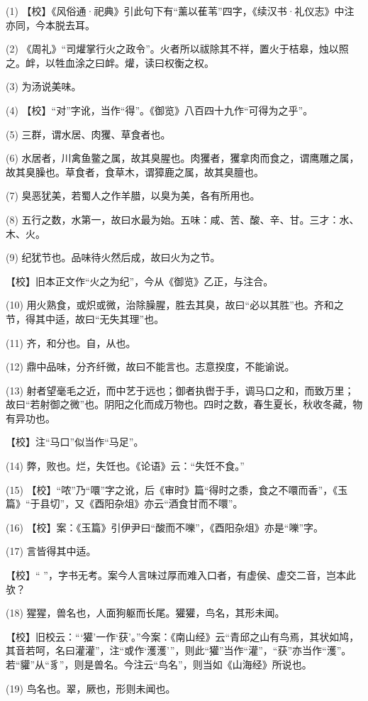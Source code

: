 \documentclass[12pt,UTF8]{ctexbook}
\begin{document}
(1) 【校】《风俗通·祀典》引此句下有“薰以萑苇”四字，《续汉书·礼仪志》中注亦同，今本脱去耳。

(2) 《周礼》“司爟掌行火之政令”。火者所以祓除其不祥，置火于桔皋，烛以照之。衅，以牲血涂之曰衅。爟，读曰权衡之权。

(3) 为汤说美味。

(4) 【校】“对”字讹，当作“得”。《御览》八百四十九作“可得为之乎”。

(5) 三群，谓水居、肉玃、草食者也。

(6) 水居者，川禽鱼鳖之属，故其臭腥也。肉玃者，玃拿肉而食之，谓鹰雕之属，故其臭臊也。草食者，食草木，谓獐鹿之属，故其臭膻也。

(7) 臭恶犹美，若蜀人之作羊腊，以臭为美，各有所用也。

(8) 五行之数，水第一，故曰水最为始。五味：咸、苦、酸、辛、甘。三才：水、木、火。

(9) 纪犹节也。品味待火然后成，故曰火为之节。

【校】旧本正文作“火之为纪”，今从《御览》乙正，与注合。

(10) 用火熟食，或炽或微，治除臊腥，胜去其臭，故曰“必以其胜”也。齐和之节，得其中适，故曰“无失其理”也。

(11) 齐，和分也。自，从也。

(12) 鼎中品味，分齐纤微，故曰不能言也。志意揆度，不能谕说。

(13) 射者望毫毛之近，而中艺于远也；御者执辔于手，调马口之和，而致万里；故曰“若射御之微”也。阴阳之化而成万物也。四时之数，春生夏长，秋收冬藏，物有异功也。

【校】注“马口”似当作“马足”。

(14) 弊，败也。烂，失饪也。《论语》云：“失饪不食。”

(15) 【校】“哝”乃“噮”字之讹，后《审时》篇“得时之黍，食之不噮而香”，《玉篇》“于县切”，又《酉阳杂俎》亦云“酒食甘而不噮”。

(16) 【校】案：《玉篇》引伊尹曰“酸而不嚛”，《酉阳杂俎》亦是“嚛”字。

(17) 言皆得其中适。

【校】“ ”，字书无考。案今人言味过厚而难入口者，有虚侯、虚交二音，岂本此欤？

(18) 猩猩，兽名也，人面狗躯而长尾。獾獾，鸟名，其形未闻。

【校】旧校云：“‘獾’一作‘获’。”今案：《南山经》云“青邱之山有鸟焉，其状如鸠，其音若呵，名曰灌灌”，注“或作‘濩濩’”，则此“獾”当作“灌”，“获”亦当作“濩”。若“貛”从“豸”，则是兽名。今注云“鸟名”，则当如《山海经》所说也。

(19) 鸟名也。翠，厥也，形则未闻也。
\end{document}
